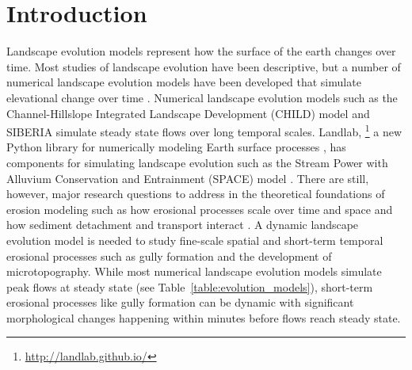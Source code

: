 \documentclass[final,3p,times,twocolumn]{elsarticle}
\begin{document}
\tableofcontents
\vfil
\pagebreak






\section{Introduction}

Landscape evolution models represent how the surface of the earth changes over time. 
Most studies of landscape evolution have been descriptive, 
but a number of numerical landscape evolution models 
have been developed that simulate elevational change over time 
\cite{Temme2013}. 
Numerical landscape evolution models
such as the Channel-Hillslope Integrated Landscape Development (CHILD) model 
\cite{Tucker2001} 
and SIBERIA \cite{Willgoose2005}
simulate steady state flows over long temporal scales. 
Landlab,
\footnote{\url{http://landlab.github.io/}}
a new Python library for numerically modeling Earth surface processes
\cite{Hobley2017},
has components for simulating landscape evolution such as the 
Stream Power with Alluvium Conservation and Entrainment (SPACE) 
model \cite{Shobe2017}.
There are still, however, major research questions 
to address in the theoretical foundations of erosion modeling 
such as how erosional processes scale over time and space 
and how sediment detachment and transport interact \cite{Mitasova2013}. 
A dynamic landscape evolution model is needed to study
fine-scale spatial and short-term temporal erosional processes
such as gully formation and the development of microtopography. 
While most numerical landscape evolution models 
simulate peak flows at steady state
(see Table~\ref{table:evolution_models}),
short-term erosional processes like gully formation can be dynamic
with significant morphological changes happening within minutes
before flows reach steady state. 
\end{document}
